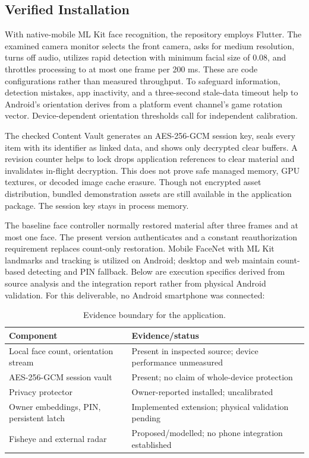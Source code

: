 \documentclass[conference]{IEEEtran}
\begin{document}
\subsection{Verified Installation}
With native-mobile ML Kit face recognition, the repository employs Flutter. The examined camera monitor selects the front camera, asks for medium resolution, turns off audio, utilizes rapid detection with minimum facial size of 0.08, and throttles processing to at most one frame per 200 ms. These are code configurations rather than measured throughput. To safeguard information, detection mistakes, app inactivity, and a three-second stale-data timeout help to Android's orientation derives from a platform event channel's game rotation vector. Device-dependent orientation thresholds call for independent calibration.

The checked Content Vault generates an AES-256-GCM session key, seals every item with its identifier as linked data, and shows only decrypted clear buffers. A revision counter helps to lock drops application references to clear material and invalidates in-flight decryption. This does not prove safe managed memory, GPU textures, or decoded image cache erasure. Though not encrypted asset distribution, bundled demonstration assets are still available in the application package. The session key stays in process memory.

The baseline face controller normally restored material after three frames and at most one face. The present version authenticates and a constant reauthorization requirement replaces count-only restoration. Mobile FaceNet with ML Kit landmarks and tracking is utilized on Android; desktop and web maintain count-based detecting and PIN fallback. Below are execution specifics derived from source analysis and the integration report rather from physical Android validation. For this deliverable, no Android smartphone was connected:

\begin{table}[t]\caption{Evidence boundary for the application.}\label{tab:status}\centering\footnotesize
\begin{tabular}{@{}P{0.39\columnwidth}P{0.52\columnwidth}@{}}\toprule
Component & Evidence/status\\\midrule
Local face count, orientation stream & Present in inspected source; device performance unmeasured\\
AES-256-GCM session vault & Present; no claim of whole-device protection\\
Privacy protector & Owner-reported installed; uncalibrated\\
Owner embeddings, PIN, persistent latch & Implemented extension; physical validation pending\\
Fisheye and external radar & Proposed/modelled; no phone integration established\\\bottomrule
\end{tabular}\end{table}
\end{document}
